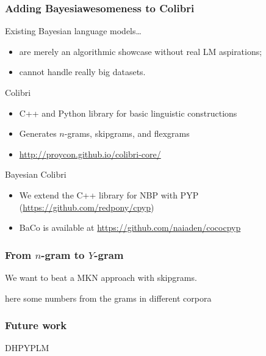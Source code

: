 \documentclass{beamer}
\begin{document}
\begin{frame}
    \frametitle{Adding Bayesiawesomeness to Colibri}
    
    Existing Bayesian language models\ldots
        \begin{itemize}
            \item are merely an algorithmic showcase without real LM aspirations;
            \item cannot handle really big datasets.
        \end{itemize}

    \begin{block}{Colibri}
        \begin{itemize}
            \item C++ and Python library for basic linguistic constructions
            \item Generates $n$-grams, skipgrams, and flexgrams
            \item \url{http://proycon.github.io/colibri-core/}
        \end{itemize}
    \end{block}
    \vspace{-0.25cm}
    \begin{block}{Bayesian Colibri}
        \begin{itemize}
            \item We extend the C++ library for NBP with PYP (\url{https://github.com/redpony/cpyp})
            \item BaCo is available at \url{https://github.com/naiaden/cococpyp}
        \end{itemize}
    \end{block}
\end{frame}

\begin{frame}
    \frametitle{From $n$-gram to $Y$-gram}

    We want to beat a MKN approach with skipgrams.

    here some numbers from the grams in different corpora

\end{frame}

\begin{frame}
    \frametitle{Future work}

    DHPYPLM
\end{frame}
\end{document}
